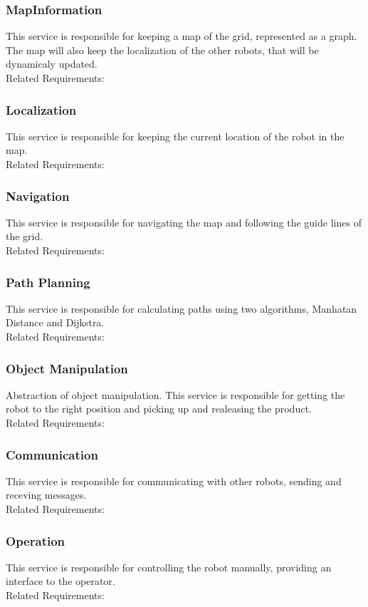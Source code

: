 \subsubsection*{MapInformation}
This service is responsible for keeping a map of the grid, represented as a graph. The map will also keep the localization of the other robots, that will be dynamicaly updated.
\\Related Requirements:

\subsubsection*{Localization}
This service is responsible for keeping the current location of the robot in the map. 
\\Related Requirements:

\subsubsection*{Navigation}
This service is responsible for navigating the map and following the guide lines of the grid. 
\\Related Requirements:

\subsubsection*{Path Planning}
This service is responsible for calculating paths using two algorithms, Manhatan Distance and Dijkstra. 
\\Related Requirements:

\subsubsection*{Object Manipulation}
Abstraction of object manipulation. This service is responsible for getting the robot to the right position and picking up and realeasing the product.
\\Related Requirements:

\subsubsection*{Communication}
This service is responsible for communicating with other robots, sending and receving messages.
\\Related Requirements:

\subsubsection*{Operation}
This service is responsible for controlling the robot manually, providing an interface to the operator.
\\Related Requirements:

